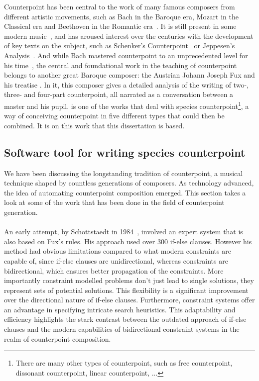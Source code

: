 Counterpoint has been central to the work of many famous composers from different artistic movements, such as Bach in the Baroque era, Mozart in the Classical era and Beethoven in the Romantic era~\cite{kramer1987gradus}. It is still present in some modern music~\cite{altozano2017contrapunto}, and has aroused interest over the centuries with the development of key texts on the subject, such as Schenker's Counterpoint~\cite{schenker1906} or Jeppesen's Analysis~\cite{jeppesen1960}. And while Bach mastered counterpoint to an unprecedented level for his time~\cite{yearsley2002}, the central and foundational work in the teaching of counterpoint belongs to another great Baroque composer: the Austrian Johann Joseph Fux and his treatise \gap. In it, this composer gives a detailed analysis of the writing of two-, three- and four-part counterpoint, all narrated as a conversation between a master and his pupil. \gaps is one of the works that deal with species counterpoint\footnote{There are many other types of counterpoint, such as free counterpoint, dissonant counterpoint, linear counterpoint, ...}, a way of conceiving counterpoint in five different types that could then be combined. It is on this work that this dissertation is based.

\subsection{Software tool for writing species counterpoint}
We have been discussing the longstanding tradition of counterpoint, a musical technique shaped by countless generations of composers. As technology advanced, the idea of automating counterpoint composition emerged. This section takes a look at some of the work that has been done in the field of counterpoint generation.

\paragraph{} An early attempt, by Schottstaedt in 1984~\cite{bill1984}, involved an expert system that is also based on Fux's rules. His approach used over 300 if-else clauses. However his method had obvious limitations compared to what modern constraints are capable of, since if-else clauses are unidirectional, whereas constraints are bidirectional, which ensures better propagation of the constraints. More importantly constraint modelled problems don't just lead to single solutions, they represent sets of potential solutions. This flexibility is a significant improvement over the directional nature of if-else clauses. 
Furthermore, constraint systems offer an advantage in specifying intricate search heuristics. This adaptability and efficiency highlights the stark contrast between the outdated approach of if-else clauses and the modern capabilities of bidirectional constraint systems in the realm of counterpoint composition.

